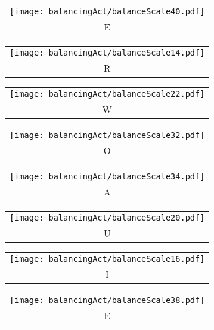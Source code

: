 \begin{puzzle}
\begin{center}
  \end{center}
  \begin{center}
    \begin{tabular}{c}\texttt{[image: balancingAct/balanceScale40.pdf]}\\E\end{tabular}
    \begin{tabular}{c}\texttt{[image: balancingAct/balanceScale14.pdf]}\\R\end{tabular}
    \begin{tabular}{c}\texttt{[image: balancingAct/balanceScale22.pdf]}\\W\end{tabular}
    \begin{tabular}{c}\texttt{[image: balancingAct/balanceScale32.pdf]}\\O\end{tabular}
  \end{center}
  \begin{center}
    \begin{tabular}{c}\texttt{[image: balancingAct/balanceScale34.pdf]}\\A\end{tabular}
    \begin{tabular}{c}\texttt{[image: balancingAct/balanceScale20.pdf]}\\U\end{tabular}
    \begin{tabular}{c}\texttt{[image: balancingAct/balanceScale16.pdf]}\\I\end{tabular}
    \begin{tabular}{c}\texttt{[image: balancingAct/balanceScale38.pdf]}\\E\end{tabular}
  \end{center}

\end{puzzle}

